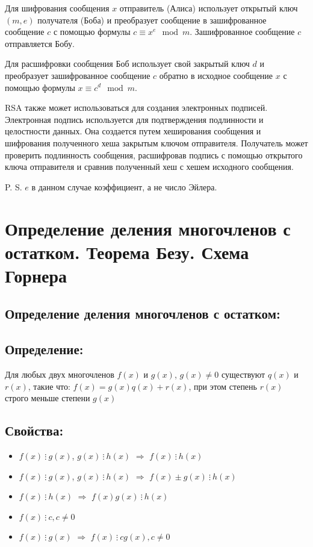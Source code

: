 \documentclass[12pt]{article}
\begin{document}
Для шифрования сообщения $x$ отправитель (Алиса) использует открытый ключ $(m,e)$ получателя (Боба) и преобразует сообщение в зашифрованное сообщение $c$ с помощью формулы $c \equiv x^e \mod m$. Зашифрованное сообщение $c$ отправляется Бобу.

Для расшифровки сообщения Боб использует свой закрытый ключ $d$ и преобразует зашифрованное сообщение $c$ обратно в исходное сообщение $x$ с помощью формулы $x \equiv c^d \mod m$.

RSA также может использоваться для создания электронных подписей. Электронная подпись используется для подтверждения подлинности и целостности данных. Она создается путем хеширования сообщения и шифрования полученного хеша закрытым ключом отправителя. Получатель может проверить подлинность сообщения, расшифровав подпись с помощью открытого ключа отправителя и сравнив полученный хеш с хешем исходного сообщения.

P. S. $e$ в данном случае коэффициент, а не число Эйлера.

\section{Определение деления многочленов с остатком. Теорема Безу. Схема Горнера}
\subsection{Определение деления многочленов с остатком:}
\subsection{Определение:}
Для любых двух многочленов $f(x)$ и $g(x)$, $g(x)\neq {0}$ существуют $q(x)$ и $r(x)$, такие что: $f(x) = g(x)q(x) + r(x)$, при этом степень $r(x)$ строго меньше степени $g(x)$\par
\subsection{Свойства:}
\begin{itemize}
    \item $f(x) \ \vdots\ g(x)$, $g(x) \ \vdots\  h(x)$ $\Rightarrow$ $f(x) \ \vdots\ h(x)$
    \item $f(x) \ \vdots\ g(x)$, $g(x) \ \vdots\  h(x)$ $\Rightarrow$ $f(x){\pm}g(x) \ \vdots\ h(x)$
    \item $f(x) \ \vdots\ h(x)$ $\Rightarrow$ $f(x)g(x) \ \vdots\ h(x)$
    \item $f(x) \ \vdots\ c, c\neq{0}$
    \item $f(x) \ \vdots\ g(x)$ $\Rightarrow$ $f(x) \ \vdots\ cg(x), c\neq{0}$
\end{itemize}
\end{document}
